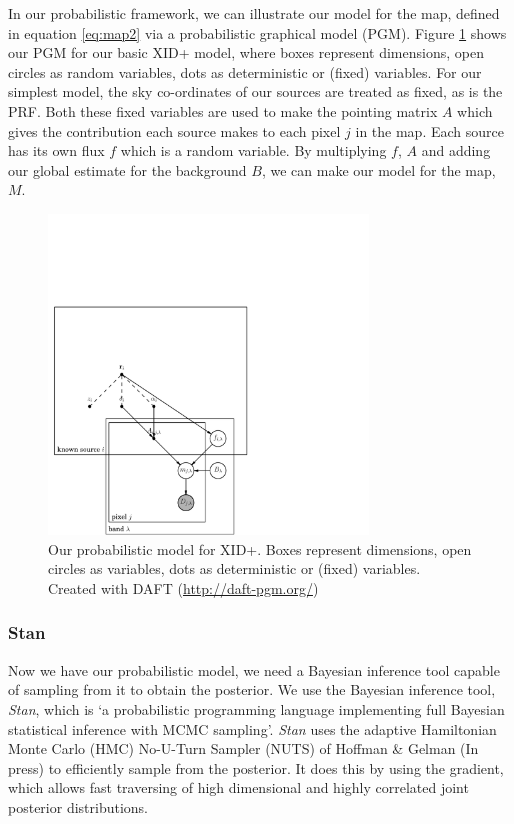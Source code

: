 \documentclass[useAMS,usenatbib]{mnras}
\begin{document}
In our probabilistic framework, we can illustrate our model for the map, defined in equation \ref{eq:map2} via a probabilistic graphical model (PGM). Figure \ref{fig:graph_mod_xid+} shows our PGM for our basic XID+ model, where boxes represent dimensions, open circles as random variables, dots as deterministic or (fixed) variables. For our simplest model, the sky co-ordinates of our sources are treated as fixed, as is the PRF. Both these fixed variables are used to make the pointing matrix $A$ which gives the contribution each source makes to each pixel $j$ in the map. Each source has its own flux $f$ which is a random variable. By multiplying $f$, $A$ and adding our global estimate for the background $B$, we can make our model for the map, $M$. 
\begin{figure}
\includegraphics[width=8.5cm]{./graphical_model.pdf}
\caption{Our probabilistic model for XID+. Boxes represent dimensions, open circles as variables, dots as deterministic or (fixed) variables. Created with DAFT (\url{http://daft-pgm.org/})}\label{fig:graph_mod_xid+}
\end{figure}
 
\subsubsection{Stan}
Now we have our probabilistic model, we need a Bayesian inference tool capable of sampling from it to obtain the posterior. We use the Bayesian inference tool, \textit{Stan}, which is `a probabilistic programming language implementing full Bayesian statistical inference with MCMC sampling'. \textit{Stan} uses the adaptive Hamiltonian Monte Carlo (HMC) No-U-Turn Sampler (NUTS) of Hoffman & Gelman (In press) to efficiently sample from the posterior. It does this by using the gradient, which allows fast traversing of high dimensional and highly correlated joint posterior distributions. 
\end{document}
